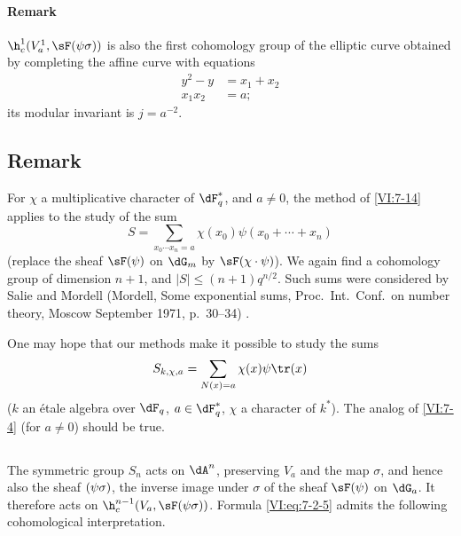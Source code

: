 \paragraph{Remark}

$\h_c^1(V_a^1,\sF(\psi\sigma))$ is also the first cohomology group of 
the elliptic curve obtained by completing the affine curve with equations 
\begin{align*}
  y^2-y &= x_1+x_2 \\
  x_1 x_2 &= a \text{;} 
\end{align*}
its modular invariant is $j=a^{-2}$. 





\subsection{Remark}\label{VI:7-18}

For $\chi$ a multiplicative character of $\dF_q^\ast$, and $a\ne 0$, the 
method of \ref{VI:7-14} applies to the study of the sum 
\[
  S = \sum_{x_0\dotsm x_n = a} \chi(x_0) \psi(x_0+\cdots + x_n) 
\]
(replace the sheaf $\sF(\psi)$ on $\dG_m$ by $\sF(\chi\cdot \psi)$). We 
again find a cohomology group of dimension $n+1$, and 
$|S|\leqslant (n+1)q^{n/2}$. Such sums were considered by 
Salie and Mordell (Mordell, Some exponential sums, Proc.~Int.~Conf.~on number theory, Moscow September 1971, p.~30--34) \cite{mo73}.

One may hope that our methods make it possible to study the sums 
\[
  S_{k,\chi,a} = \sum_{N(x)=a} \chi(x) \psi \tr(x) 
\]
($k$ an étale algebra over $\dF_q$, $a\in \dF_q^\ast$, $\chi$ a character of 
$k^\ast$). The analog of \ref{VI:7-4} (for $a\ne 0$) should be true. 





\subsection{}\label{VI:7-19}

The symmetric group $S_n$ acts on $\dA^n$, preserving $V_a$ and 
the map $\sigma$, and hence also the sheaf $\sf(\psi\sigma)$, the inverse 
image under $\sigma$ of the sheaf $\sF(\psi)$ on $\dG_a$. It therefore acts 
on $\h_c^{n-1}(V_a,\sF(\psi\sigma))$. Formula \eqref{VI:eq:7-2-5} admits 
the following cohomological interpretation.





